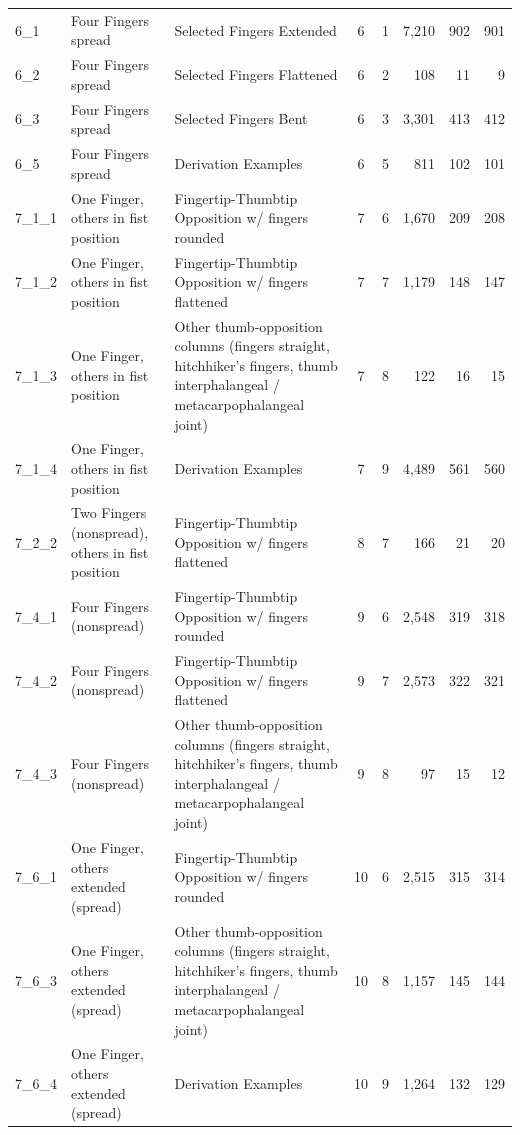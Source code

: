\begin{tabular}{lllccrrr}
6\_1 & Four Fingers spread & Selected Fingers Extended & 6 & 1 & 7,210 & 902 & 901 \\
6\_2 & Four Fingers spread & Selected Fingers Flattened & 6 & 2 & 108 & 11 & 9 \\
6\_3 & Four Fingers spread & Selected Fingers Bent & 6 & 3 & 3,301 & 413 & 412 \\
6\_5 & Four Fingers spread & Derivation Examples & 6 & 5 & 811 & 102 & 101 \\
7\_1\_1 & One Finger, others in fist position & Fingertip-Thumbtip Opposition w/ fingers rounded & 7 & 6 & 1,670 & 209 & 208 \\
7\_1\_2 & One Finger, others in fist position & Fingertip-Thumbtip Opposition w/ fingers flattened & 7 & 7 & 1,179 & 148 & 147 \\
7\_1\_3 & One Finger, others in fist position & Other thumb-opposition columns (fingers straight, hitchhiker's fingers, thumb interphalangeal / metacarpophalangeal joint) & 7 & 8 & 122 & 16 & 15 \\
7\_1\_4 & One Finger, others in fist position & Derivation Examples & 7 & 9 & 4,489 & 561 & 560 \\
7\_2\_2 & Two Fingers (nonspread), others in fist position & Fingertip-Thumbtip Opposition w/ fingers flattened & 8 & 7 & 166 & 21 & 20 \\
7\_4\_1 & Four Fingers (nonspread) & Fingertip-Thumbtip Opposition w/ fingers rounded & 9 & 6 & 2,548 & 319 & 318 \\
7\_4\_2 & Four Fingers (nonspread) & Fingertip-Thumbtip Opposition w/ fingers flattened & 9 & 7 & 2,573 & 322 & 321 \\
7\_4\_3 & Four Fingers (nonspread) & Other thumb-opposition columns (fingers straight, hitchhiker's fingers, thumb interphalangeal / metacarpophalangeal joint) & 9 & 8 & 97 & 15 & 12 \\
7\_6\_1 & One Finger, others extended (spread) & Fingertip-Thumbtip Opposition w/ fingers rounded & 10 & 6 & 2,515 & 315 & 314 \\
7\_6\_3 & One Finger, others extended (spread) & Other thumb-opposition columns (fingers straight, hitchhiker's fingers, thumb interphalangeal / metacarpophalangeal joint) & 10 & 8 & 1,157 & 145 & 144 \\
7\_6\_4 & One Finger, others extended (spread) & Derivation Examples & 10 & 9 & 1,264 & 132 & 129 \\
\bottomrule
\end{tabular}
